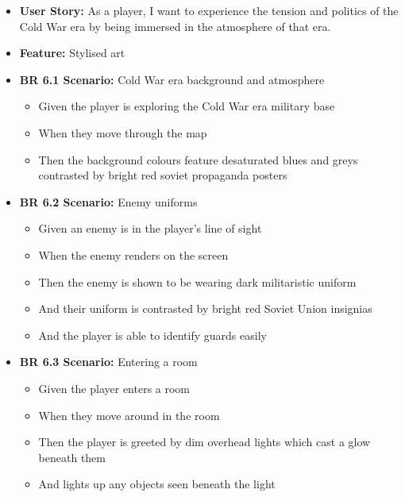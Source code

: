 \documentclass[11pt, a4paper]{article}
\begin{document}
\begin{itemize}
    \item \textbf{User Story:} As a player, I want to experience the tension and politics of the Cold War era by being immersed in the atmosphere of that era.

    \item \textbf{Feature:} Stylised art

    \item \textbf{BR 6.1 Scenario:} Cold War era background and atmosphere

          \begin{itemize}
              \item Given the player is exploring the Cold War era military base
              \item When they move through the map
              \item Then the background colours feature desaturated blues and greys contrasted by bright red soviet propaganda posters
          \end{itemize}

    \item \textbf{BR 6.2 Scenario:} Enemy uniforms

          \begin{itemize}
              \item Given an enemy is in the player’s line of sight
              \item When the enemy renders on the screen
              \item Then the enemy is shown to be wearing dark militaristic uniform
              \item And their uniform is contrasted by bright red Soviet Union insignias
              \item And the player is able to identify guards easily
          \end{itemize}

    \item \textbf{BR 6.3 Scenario:} Entering a room

          \begin{itemize}
              \item Given the player enters a room
              \item When they move around in the room
              \item Then the player is greeted by dim overhead lights which cast a glow beneath them
              \item And lights up any objects seen beneath the light
          \end{itemize}


\end{itemize}
\end{document}
